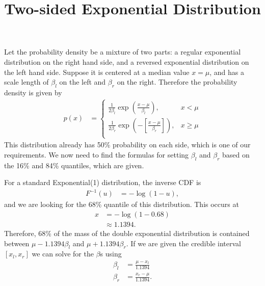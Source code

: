 \documentclass[a4paper, 12pt]{article}
\title{Two-sided Exponential Distribution}
\author{}
\date{}
\begin{document}
\maketitle


\setlength{\parindent}{0pt}
\setlength{\parskip}{8pt}


Let the probability density be a mixture of two parts: a regular exponential
distribution on the right hand side, and a reversed exponential distribution on
the left hand side. Suppose it is centered at a median value $x=\mu$, and
has a scale length of $\beta_l$ on the left and $\beta_r$ on the right.
Therefore the probability density is given by
\begin{align}
p(x) &= \left\{
    \begin{array}{lr}
    \frac{1}{2\beta_l}\exp\left(\frac{x-\mu}{\beta_l} \right), & x < \mu \\
    \frac{1}{2\beta_r}\exp\left(-\left[\frac{x-\mu}{\beta_r}\right]\right),
                                & x \geq \mu \\
    \end{array}
    \right.
\end{align}
This distribution already has 50\% probability on
each side, which is one of our requirements.
We now need to find the formulas for setting $\beta_l$ and $\beta_r$ based on
the 16\% and 84\% quantiles, which are given.

For a standard Exponential(1) distribution, the inverse CDF is
\begin{align}
F^{-1}(u) &= -\log(1 - u),
\end{align}
and we are looking for the 68\% quantile of this distribution.
This occurs at
\begin{align}
x &= -\log(1 - 0.68) \\
  &\approx 1.1394.
\end{align}
Therefore, 68\% of the mass of the double exponential distribution is
contained between $\mu-1.1394\beta_l$ and $\mu + 1.1394\beta_r$.
If we are given the credible interval $[x_l, x_r]$ we can solve for the
$\beta$s using
\begin{align}
\beta_l &= \frac{\mu - x_l}{1.1394} \\
\beta_r &= \frac{x_r - \mu}{1.1394}.
\end{align}
\end{document}

